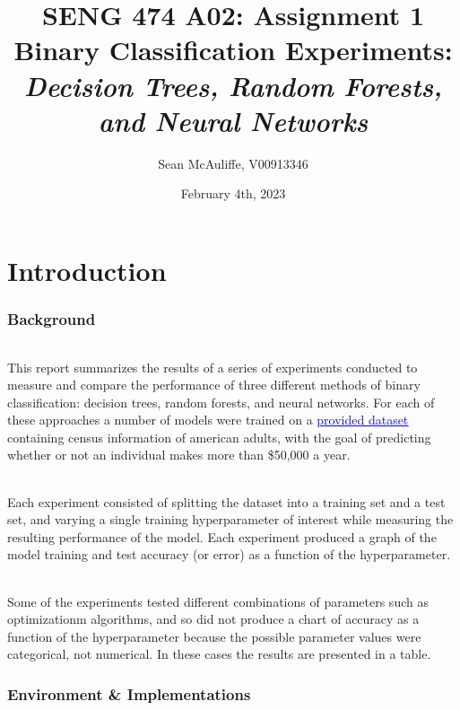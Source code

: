 \documentclass[12pt, letterpaper]{article}
\title{SENG 474 A02: Assignment 1 \\[1ex]
\large Binary Classification Experiments:
\large \textit{Decision Trees, Random Forests, and Neural Networks}}
\author{Sean McAuliffe, V00913346 }
\date{February 4th, 2023}
\begin{document}
\maketitle

\pagebreak
\tableofcontents
\pagebreak

\part*{Introduction}

\section{Background}

\paragraph*{}This report summarizes the results of a series of experiments
conducted to measure and compare the performance of three different methods of
binary classification: decision trees, random forests, and neural networks. For
each of these approaches a number of models were trained on a
\href{https://archive.ics.uci.edu/ml/datasets/adult}{\textcolor{blue}{\underline{provided dataset}}}
containing census information of american adults, with the goal of predicting
whether or not an individual makes more than \$50,000 a year.

\paragraph*{}Each experiment consisted of splitting the dataset into a
training set and a test set, and varying a single training hyperparameter of
interest while measuring the resulting performance of the model. Each experiment
produced a graph of the model training and test accuracy (or error) as a
function of the hyperparameter.

\paragraph*{}Some of the experiments tested  different combinations of
parameters such as optimizationm algorithms, and so did not produce a chart of
accuracy as a function of the hyperparameter because the possible parameter
values were categorical, not numerical. In these cases the results are
presented in a table.

\section{Environment \& Implementations}
\end{document}
